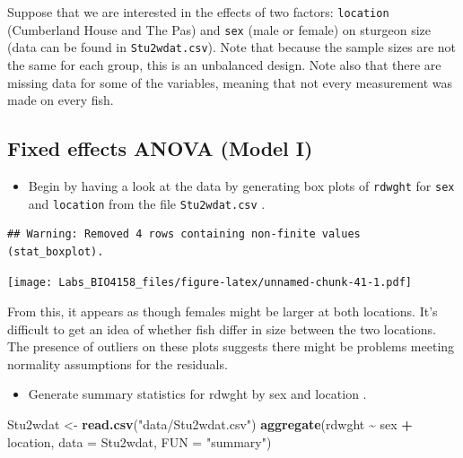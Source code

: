 \documentclass[
  12pt,
]{book}
\newenvironment{Shaded}{\begin{snugshade}}{\end{snugshade}}
\newcommand{\DataTypeTok}[1]{\textcolor[rgb]{0.13,0.29,0.53}{#1}}
\newcommand{\KeywordTok}[1]{\textcolor[rgb]{0.13,0.29,0.53}{\textbf{#1}}}
\newcommand{\NormalTok}[1]{#1}
\newcommand{\OperatorTok}[1]{\textcolor[rgb]{0.81,0.36,0.00}{\textbf{#1}}}
\newcommand{\StringTok}[1]{\textcolor[rgb]{0.31,0.60,0.02}{#1}}
\providecommand{\tightlist}{%
  \setlength{\itemsep}{0pt}\setlength{\parskip}{0pt}}
\begin{document}
Suppose that we are interested in the effects of two factors: \texttt{location} (Cumberland House and The Pas) and \texttt{sex} (male or female) on sturgeon size (data can be found in \texttt{Stu2wdat.csv}). Note that because the sample sizes are not the same for each group, this is an unbalanced design. Note also that there are missing data for some of the variables, meaning that not every measurement was made on every fish.

\hypertarget{fixed-effects-anova-model-i}{%
\subsection{Fixed effects ANOVA (Model I)}\label{fixed-effects-anova-model-i}}

\begin{itemize}
\tightlist
\item
  Begin by having a look at the data by generating box plots of \texttt{rdwght} for \texttt{sex} and \texttt{location} from the file \texttt{Stu2wdat.csv} .
\end{itemize}

\begin{verbatim}
## Warning: Removed 4 rows containing non-finite values (stat_boxplot).
\end{verbatim}

\texttt{[image: Labs\_BIO4158\_files/figure-latex/unnamed-chunk-41-1.pdf]}

From this, it appears as though females might be larger at both locations. It's difficult to get an idea of whether fish differ in size between the two locations. The presence of outliers on these plots suggests there might be problems meeting normality assumptions for the residuals.

\begin{itemize}
\tightlist
\item
  Generate summary statistics for rdwght by sex and location .
\end{itemize}

\begin{Shaded}
\begin{Highlighting}[]
\NormalTok{Stu2wdat \textless{}{-}}\StringTok{ }\KeywordTok{read.csv}\NormalTok{(}\StringTok{"data/Stu2wdat.csv"}\NormalTok{)}
\KeywordTok{aggregate}\NormalTok{(rdwght }\OperatorTok{\textasciitilde{}}\StringTok{ }\NormalTok{sex }\OperatorTok{+}\StringTok{ }\NormalTok{location, }\DataTypeTok{data =}\NormalTok{ Stu2wdat, }\DataTypeTok{FUN =} \StringTok{"summary"}\NormalTok{)}
\end{Highlighting}
\end{Shaded}
\end{document}
